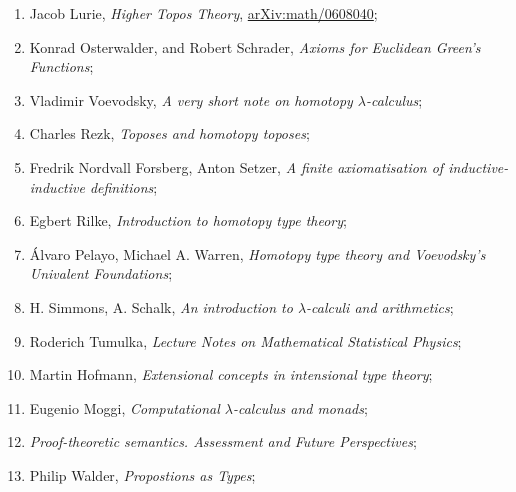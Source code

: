 \documentclass[a4paper,11pt]{article}
\begin{document}
\begin{enumerate}
\item Jacob Lurie, \textit{Higher Topos Theory},
  \href{https://arxiv.org/abs/math/0608040v4}{arXiv:math/0608040};



\item Konrad Osterwalder, and Robert Schrader, \textit{Axioms for
    Euclidean Green's Functions};



\item Vladimir Voevodsky, \textit{A very short note on homotopy
    $\lambda$-calculus};



\item Charles Rezk, \textit{Toposes and homotopy toposes};



\item Fredrik Nordvall Forsberg, Anton Setzer, \textit{A finite
    axiomatisation of inductive-inductive definitions};



\item Egbert Rilke, \textit{Introduction to homotopy type theory};



\item \'{A}lvaro Pelayo, Michael A. Warren, \textit{Homotopy type
    theory and Voevodsky’s Univalent Foundations};



\item H. Simmons, A. Schalk, \textit{An introduction to
    $\lambda$-calculi and arithmetics};



\item Roderich Tumulka, \textit{Lecture Notes on Mathematical
    Statistical Physics};



\item Martin Hofmann, \textit{Extensional concepts in intensional type
    theory};



\item Eugenio Moggi, \textit{Computational $\lambda$-calculus and monads};



\item \textit{Proof-theoretic semantics. Assessment and Future
    Perspectives};



\item Philip Walder, \textit{Propostions as Types};




\end{enumerate}
\end{document}
